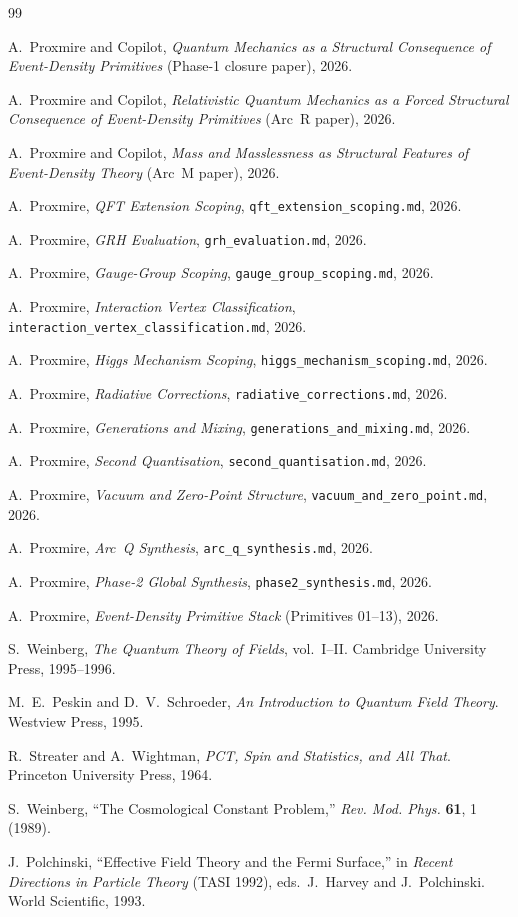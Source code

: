 \documentclass[11pt,a4paper]{article}
\begin{document}
\begin{thebibliography}{99}

A.~Proxmire and Copilot, \emph{Quantum Mechanics as a Structural Consequence of Event-Density Primitives} (Phase-1 closure paper), 2026.

A.~Proxmire and Copilot, \emph{Relativistic Quantum Mechanics as a Forced Structural Consequence of Event-Density Primitives} (Arc~R paper), 2026.

A.~Proxmire and Copilot, \emph{Mass and Masslessness as Structural Features of Event-Density Theory} (Arc~M paper), 2026.

A.~Proxmire, \emph{QFT Extension Scoping}, \texttt{qft\_extension\_scoping.md}, 2026.

A.~Proxmire, \emph{GRH Evaluation}, \texttt{grh\_evaluation.md}, 2026.

A.~Proxmire, \emph{Gauge-Group Scoping}, \texttt{gauge\_group\_scoping.md}, 2026.

A.~Proxmire, \emph{Interaction Vertex Classification}, \texttt{interaction\_vertex\_classification.md}, 2026.

A.~Proxmire, \emph{Higgs Mechanism Scoping}, \texttt{higgs\_mechanism\_scoping.md}, 2026.

A.~Proxmire, \emph{Radiative Corrections}, \texttt{radiative\_corrections.md}, 2026.

A.~Proxmire, \emph{Generations and Mixing}, \texttt{generations\_and\_mixing.md}, 2026.

A.~Proxmire, \emph{Second Quantisation}, \texttt{second\_quantisation.md}, 2026.

A.~Proxmire, \emph{Vacuum and Zero-Point Structure}, \texttt{vacuum\_and\_zero\_point.md}, 2026.

A.~Proxmire, \emph{Arc~Q Synthesis}, \texttt{arc\_q\_synthesis.md}, 2026.

A.~Proxmire, \emph{Phase-2 Global Synthesis}, \texttt{phase2\_synthesis.md}, 2026.

A.~Proxmire, \emph{Event-Density Primitive Stack} (Primitives 01--13), 2026.

S.~Weinberg, \emph{The Quantum Theory of Fields}, vol.~I--II. Cambridge University Press, 1995--1996.

M.~E.~Peskin and D.~V.~Schroeder, \emph{An Introduction to Quantum Field Theory}. Westview Press, 1995.

R.~Streater and A.~Wightman, \emph{PCT, Spin and Statistics, and All That}. Princeton University Press, 1964.

S.~Weinberg, ``The Cosmological Constant Problem,'' \emph{Rev. Mod. Phys.} \textbf{61}, 1 (1989).

J.~Polchinski, ``Effective Field Theory and the Fermi Surface,'' in \emph{Recent Directions in Particle Theory} (TASI 1992), eds.\ J.~Harvey and J.~Polchinski. World Scientific, 1993.

\end{thebibliography}
\end{document}
